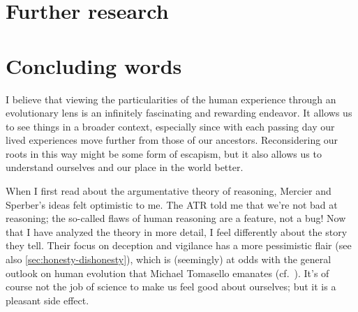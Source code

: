 \section{Further research}

\section{Concluding words}
I believe that viewing the particularities of the human experience through an evolutionary lens is an infinitely fascinating and rewarding endeavor. It allows us to see things in a broader context, especially since with each passing day our lived experiences move further from those of our ancestors. Reconsidering our roots in this way might be some form of escapism, but it also allows us to understand ourselves and our place in the world better.

When I first read about the argumentative theory of reasoning, Mercier and Sperber's ideas felt optimistic to me. The ATR told me that we're not bad at reasoning; the so-called flaws of human reasoning are a feature, not a bug! Now that I have analyzed the theory in more detail, I feel differently about the story they tell. Their focus on deception and vigilance has a more pessimistic flair (see also \cref{sec:honesty-dishonesty}), which is (seemingly) at odds with the general outlook on human evolution that Michael Tomasello emanates (cf.~\citet{Tomasello09}). It's of course not the job of science to make us feel good about ourselves; but it is a pleasant side effect.
